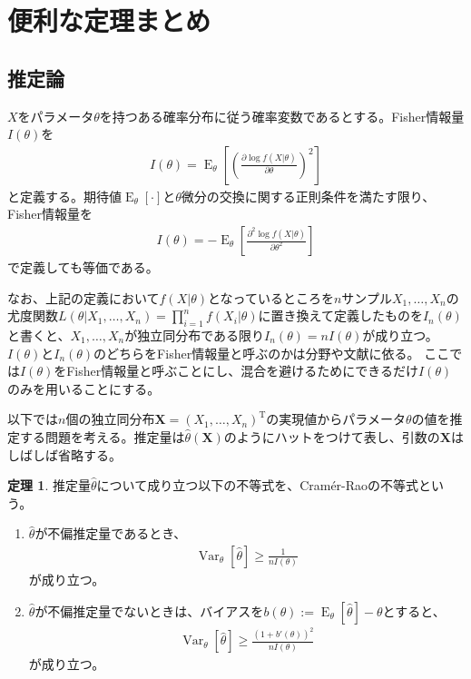 \documentclass[11pt]{ltjsarticle}
\theoremstyle{definition}
\newtheorem{theorem}{定理}[section]
\DeclareMathOperator{\E}{E}
\DeclareMathOperator{\Var}{Var}
\begin{document}
\tableofcontents

\section{便利な定理まとめ}
\subsection{推定論}
$X$をパラメータ$\theta$を持つある確率分布に従う確率変数であるとする。Fisher情報量$I(\theta)$を
\begin{align}
        I(\theta) = \E_\theta\left[\left(\frac{\partial \log f(X|\theta)}{\partial \theta}\right)^2\right]
\end{align}
と定義する。期待値$\E_\theta[\cdot]$と$\theta$微分の交換に関する正則条件を満たす限り、Fisher情報量を
\begin{align}
    I(\theta) = -\E_\theta\left[\frac{\partial^2 \log f(X|\theta)}{\partial \theta^2}\right]
\end{align}
で定義しても等価である。

なお、上記の定義において$f(X|\theta)$となっているところを$n$サンプル$X_1,\ldots,X_n$の尤度関数$L(\theta|X_1,\ldots,X_n)=\prod_{i=1}^nf(X_i|\theta)$に置き換えて定義したものを$I_n(\theta)$と書くと、$X_1, \ldots, X_n$が独立同分布である限り$I_n(\theta)=nI(\theta)$が成り立つ。
$I(\theta)$と$I_n(\theta)$のどちらをFisher情報量と呼ぶのかは分野や文献に依る。
ここでは$I(\theta)$をFisher情報量と呼ぶことにし、混合を避けるためにできるだけ$I(\theta)$のみを用いることにする。

以下では$n$個の独立同分布$\bm{X}=(X_1, \ldots,X_n)^{\mathrm{T}}$の実現値からパラメータ$\theta$の値を推定する問題を考える。推定量は$\widehat{\theta}(\bm{X})$のようにハットをつけて表し、引数の$\bm{X}$はしばしば省略する。

\begin{theorem}
    推定量$\widehat{\theta}$について成り立つ以下の不等式を、Cram\'{e}r-Raoの不等式という。
    \begin{enumerate}[(1)]
        \item $\widehat{\theta}$が不偏推定量であるとき、
        \begin{align}
            \Var_\theta[\widehat{\theta}] \ge \frac{1}{nI(\theta)}
        \end{align}
        が成り立つ。
        \item $\widehat{\theta}$が不偏推定量でないときは、バイアスを$b(\theta):=\E_\theta[\widehat{\theta}]-\theta$とすると、
        \begin{align}
            \Var_\theta[\widehat{\theta}]\ge\frac{(1 + b'(\theta))^2}{nI(\theta)}
        \end{align}
        が成り立つ。
    \end{enumerate}
\end{theorem}
\end{document}
